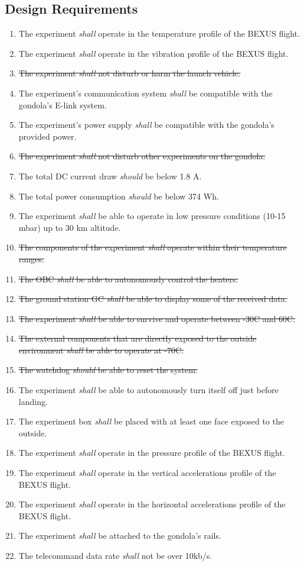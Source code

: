 \subsection{Design Requirements}

\begin{enumerate}[label=D.\arabic*]
    \item The experiment \textit{shall} operate in the temperature profile of the BEXUS flight.
    \item The experiment \textit{shall} operate in the vibration profile of the BEXUS flight.
    \item \st{The experiment \textit{shall} not disturb or harm the launch vehicle.}
    \item The experiment's communication system \textit{shall} be compatible with the gondola's E-link system.
    \item The experiment's power supply \textit{shall} be compatible with the gondola's provided power.
    \item \st{The experiment \textit{shall} not disturb other experiments on the gondola.}
    \item The total DC current draw \textit{should} be below 1.8 A.
    \item The total power consumption \textit{should} be below 374 Wh.
    \item The experiment \textit{shall} be able to operate in low pressure conditions (10-15 mbar) up to 30 km altitude.
    \item \st{The components of the experiment \textit{shall} operate within their temperature ranges.}
    \item \st{The OBC \textit{shall} be able to autonomously control the heaters.}
    \item \st{The ground station GC \textit{shall} be able to display some of the received data.}
    \item \st{The experiment \textit{shall} be able to survive and operate between -30\degree C and 60\degree C.}
    \item \st{The external components that are directly exposed to the outside environment \textit{shall} be able to operate at -70\degree C.}
    \item \st{The watchdog \textit{should} be able to reset the system.}
    \item The experiment \textit{shall} be able to autonomously turn itself off just before landing.
    \item The experiment box \textit{shall} be placed with at least one face exposed to the outside.
    \item The experiment \textit{shall} operate in the pressure profile of the BEXUS flight.
    \item The experiment \textit{shall} operate in the vertical accelerations profile of the BEXUS flight.
    \item The experiment \textit{shall} operate in the
    horizontal accelerations profile of the BEXUS flight.
    \item The experiment \textit{shall} be attached to the gondola's rails.
    \item The telecommand data rate \textit{shall} not be over 10kb/s.
\end{enumerate}